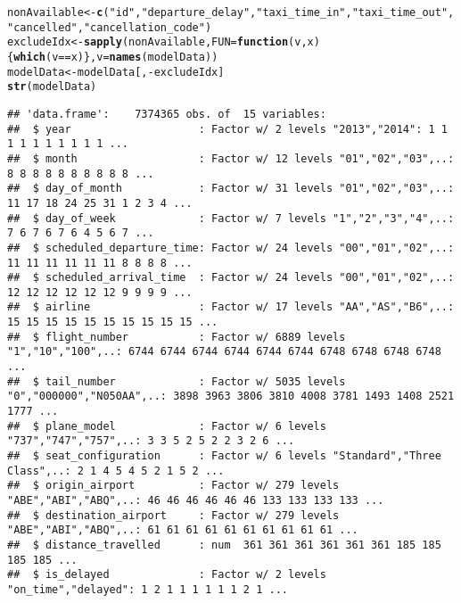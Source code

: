 \documentclass{article}\usepackage[]{graphicx}\usepackage[]{color}
\makeatletter
\newcommand{\hlstr}[1]{\textcolor[rgb]{0.192,0.494,0.8}{#1}}%
\newcommand{\hlopt}[1]{\textcolor[rgb]{0,0,0}{#1}}%
\newcommand{\hlstd}[1]{\textcolor[rgb]{0.345,0.345,0.345}{#1}}%
\newcommand{\hlkwa}[1]{\textcolor[rgb]{0.161,0.373,0.58}{\textbf{#1}}}%
\newcommand{\hlkwb}[1]{\textcolor[rgb]{0.69,0.353,0.396}{#1}}%
\newcommand{\hlkwc}[1]{\textcolor[rgb]{0.333,0.667,0.333}{#1}}%
\newcommand{\hlkwd}[1]{\textcolor[rgb]{0.737,0.353,0.396}{\textbf{#1}}}%
\newenvironment{kframe}{%
 \def\at@end@of@kframe{}%
 \ifinner\ifhmode%
  \def\at@end@of@kframe{\end{minipage}}%
  \begin{minipage}{\columnwidth}%
 \fi\fi%
 \def\FrameCommand##1{\hskip\@totalleftmargin \hskip-\fboxsep
 \colorbox{shadecolor}{##1}\hskip-\fboxsep
     \hskip-\linewidth \hskip-\@totalleftmargin \hskip\columnwidth}%
 \MakeFramed {\advance\hsize-\width
   \@totalleftmargin\z@ \linewidth\hsize
   \@setminipage}}%
 {\par\unskip\endMakeFramed%
 \at@end@of@kframe}
\newenvironment{knitrout}{}{} %
\makeatother
\begin{document}
\begin{knitrout}
\color{fgcolor}\begin{kframe}
\begin{alltt}
\hlstd{nonAvailable} \hlkwb{<-} \hlkwd{c}\hlstd{(}\hlstr{"id"}\hlstd{,} \hlstr{"departure_delay"}\hlstd{,} \hlstr{"taxi_time_in"}\hlstd{,} \hlstr{"taxi_time_out"}\hlstd{,}
                  \hlstr{"cancelled"}\hlstd{,} \hlstr{"cancellation_code"}\hlstd{)}
\hlstd{excludeIdx} \hlkwb{<-} \hlkwd{sapply}\hlstd{(nonAvailable,} \hlkwc{FUN}\hlstd{=}\hlkwa{function}\hlstd{(}\hlkwc{v}\hlstd{,} \hlkwc{x}\hlstd{)\{} \hlkwd{which}\hlstd{(v}\hlopt{==}\hlstd{x)\},} \hlkwc{v}\hlstd{=}\hlkwd{names}\hlstd{(modelData))}
\hlstd{modelData} \hlkwb{<-} \hlstd{modelData[,}\hlopt{-}\hlstd{excludeIdx]}
\hlkwd{str}\hlstd{(modelData)}
\end{alltt}
\begin{verbatim}
## 'data.frame':	7374365 obs. of  15 variables:
##  $ year                    : Factor w/ 2 levels "2013","2014": 1 1 1 1 1 1 1 1 1 1 ...
##  $ month                   : Factor w/ 12 levels "01","02","03",..: 8 8 8 8 8 8 8 8 8 8 ...
##  $ day_of_month            : Factor w/ 31 levels "01","02","03",..: 11 17 18 24 25 31 1 2 3 4 ...
##  $ day_of_week             : Factor w/ 7 levels "1","2","3","4",..: 7 6 7 6 7 6 4 5 6 7 ...
##  $ scheduled_departure_time: Factor w/ 24 levels "00","01","02",..: 11 11 11 11 11 11 8 8 8 8 ...
##  $ scheduled_arrival_time  : Factor w/ 24 levels "00","01","02",..: 12 12 12 12 12 12 9 9 9 9 ...
##  $ airline                 : Factor w/ 17 levels "AA","AS","B6",..: 15 15 15 15 15 15 15 15 15 15 ...
##  $ flight_number           : Factor w/ 6889 levels "1","10","100",..: 6744 6744 6744 6744 6744 6744 6748 6748 6748 6748 ...
##  $ tail_number             : Factor w/ 5035 levels "0","000000","N050AA",..: 3898 3963 3806 3810 4008 3781 1493 1408 2521 1777 ...
##  $ plane_model             : Factor w/ 6 levels "737","747","757",..: 3 3 5 2 5 2 2 3 2 6 ...
##  $ seat_configuration      : Factor w/ 6 levels "Standard","Three Class",..: 2 1 4 5 4 5 2 1 5 2 ...
##  $ origin_airport          : Factor w/ 279 levels "ABE","ABI","ABQ",..: 46 46 46 46 46 46 133 133 133 133 ...
##  $ destination_airport     : Factor w/ 279 levels "ABE","ABI","ABQ",..: 61 61 61 61 61 61 61 61 61 61 ...
##  $ distance_travelled      : num  361 361 361 361 361 361 185 185 185 185 ...
##  $ is_delayed              : Factor w/ 2 levels "on_time","delayed": 1 2 1 1 1 1 1 1 2 1 ...
\end{verbatim}
\end{kframe}
\end{knitrout}
\end{document}
